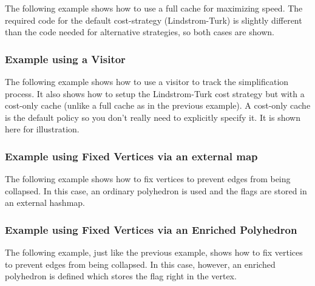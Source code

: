 The following example shows how to use a full cache for maximizing speed.
The required code for the default cost-strategy (Lindstrom-Turk) is
slightly different than the code needed for alternative strategies,
so both cases are shown.


\subsubsection{Example using a Visitor}

The following example shows how to use a visitor to track the simplification process. 
It also shows how to setup the Lindstrom-Turk cost strategy but with a cost-only 
cache (unlike a full cache as in the previous example). A cost-only cache is
the default policy so you don't really need to explicitly specify it. It is shown here
for illustration.



\subsubsection{Example using Fixed Vertices via an external map}

The following example shows how to fix vertices to prevent edges from being collapsed. 
In this case, an ordinary polyhedron is used and the flags are stored 
in an external hashmap.


\subsubsection{Example using Fixed Vertices via an Enriched Polyhedron}

The following example, just like the previous example, shows how to fix vertices to 
prevent edges from being collapsed. In this case, however, an enriched polyhedron 
is defined which stores the flag right in the vertex.




